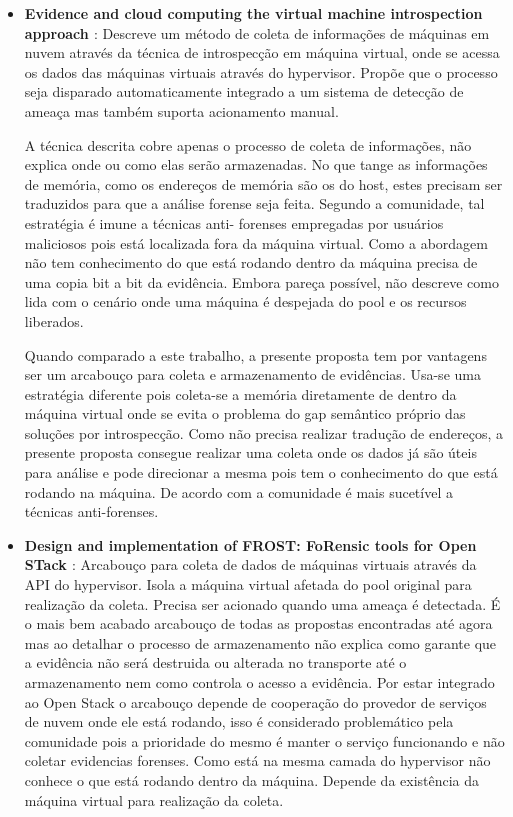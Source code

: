 \documentclass[
	12pt,				%
	openright,			%
	oneside,			%
	a4paper,			%
	english,			%
	french,				%
	spanish,			%
	brazil,				%
	]{abntex2}
\begin{document}
\begin{itemize}
\item \textbf{Evidence and cloud computing the virtual machine introspection approach \cite{Poisel2013} }: Descreve um método de coleta de informações de máquinas
em nuvem através da técnica de introspecção em máquina virtual, onde se acessa os dados das máquinas virtuais através do hypervisor. Propõe que o processo seja disparado
automaticamente integrado a um sistema de detecção de ameaça mas também suporta acionamento manual.

A técnica descrita cobre apenas o processo de coleta de informações, não explica onde ou como elas serão armazenadas. No que tange as informações de memória, como os 
endereços de memória são os do host, estes precisam ser traduzidos para que a análise forense seja feita. Segundo a comunidade, tal estratégia é imune a técnicas anti-
forenses empregadas por usuários maliciosos pois está localizada fora da máquina virtual. Como a abordagem não tem conhecimento do que está rodando dentro da máquina 
precisa de uma copia bit a bit da evidência. Embora pareça possível, não descreve como lida com o cenário onde uma máquina é despejada do pool e os recursos liberados. 

Quando comparado a este trabalho, a presente proposta tem por vantagens ser um arcabouço para coleta e armazenamento de evidências. Usa-se uma estratégia 
diferente pois coleta-se a memória diretamente de dentro da máquina virtual onde se evita o problema do gap semântico próprio das soluções por introspecção. 
Como não precisa realizar tradução de endereços, a presente proposta consegue realizar uma coleta onde os dados já são úteis para análise e pode direcionar a mesma
pois tem o conhecimento do que está rodando na máquina. De acordo com a comunidade é mais sucetível a técnicas anti-forenses.\\

\item \textbf{Design and implementation of FROST: FoRensic tools for Open STack \cite{Dykstra2013} }: Arcabouço para coleta de dados de máquinas virtuais através da API do
hypervisor. Isola a máquina virtual afetada do pool original para realização da coleta. Precisa ser acionado quando uma ameaça é detectada. É o mais bem acabado arcabouço de
todas as propostas encontradas até agora mas ao detalhar o processo de armazenamento não explica como garante que a evidência não será destruida ou alterada no transporte
até o armazenamento nem como controla o acesso a evidência. Por estar integrado ao Open Stack o arcabouço depende de cooperação do provedor de serviços de nuvem onde ele 
está rodando, isso é considerado problemático pela comunidade pois a prioridade do mesmo é manter o serviço funcionando e não coletar evidencias forenses. Como está na
mesma camada do hypervisor não conhece o que está rodando dentro da máquina. Depende da existência da máquina virtual para realização da coleta.


\end{itemize}
\end{document}
